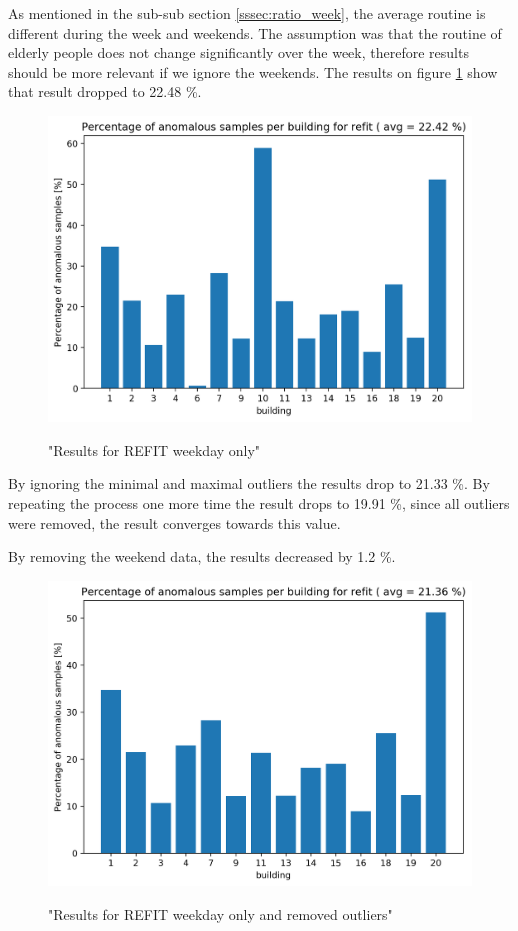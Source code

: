 As mentioned in the sub-sub section \ref{sssec:ratio_week}, the average routine is different during the week and weekends.
The assumption was that the routine of elderly people does not change significantly over the week, therefore results should be more relevant if we ignore the weekends.
The results on figure \ref{fig:refit_res_nw_1"} show that result dropped to 22.48 \%.

\begin{figure}[H]
	\centering
	\caption{"Results for REFIT weekday only"}
	\includegraphics[width=.8\textwidth]{Figures/EC/refit_res_nw_1.png}
	\label{fig:refit_res_nw_1"}
\end{figure}

By ignoring the minimal and maximal outliers the results drop to 21.33 \%.
By repeating the process one more time the result drops to 19.91 \%, since all outliers were removed, the result converges towards this value. 

By removing the weekend data, the results decreased by 1.2 \%. 

\begin{figure}[H]
	\centering
	\caption{"Results for REFIT weekday only and removed outliers"}
	\includegraphics[width=.8\textwidth]{Figures/EC/refit_res_nw_2.png}
	\label{fig:refit_res_nw_2"}
\end{figure}

